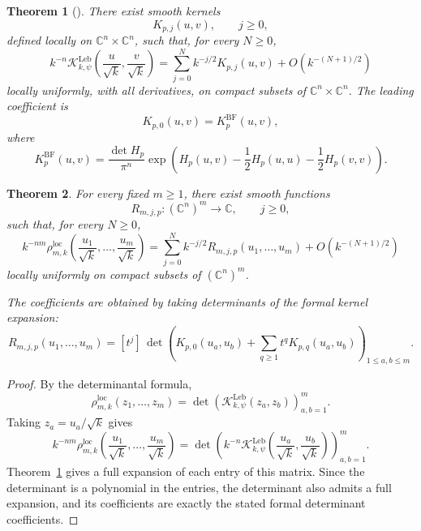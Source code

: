 \documentclass[12pt,a4paper,reqno]{article}
\theoremstyle{thmstyleone}
\newtheorem{theorem}{Theorem}[subsection]
\theoremstyle{thmstylethree}
\theoremstyle{thmstyletwo}
\numberwithin{equation}{subsection}
\def\geq{\geqslant}
\def\leq{\leqslant}
\begin{document}
\begin{theorem}[{\cite[Thms.~4.1.24 and~4.2.1]{MaMa}}]\label{thm:MM-near-diagonal}
There exist smooth kernels
\[
    K_{p,j}(u,v),\qquad j\geq 0,
\]
defined locally on $\mathbb C^n\times\mathbb C^n$, such that, for every $N\geq 0$,
\[
    k^{-n}
    \mathcal K_{k,\psi}^{\mathrm{Leb}}
    \left(\frac{u}{\sqrt k},\frac{v}{\sqrt k}\right)
    =
    \sum_{j=0}^N k^{-j/2}K_{p,j}(u,v)
    +O(k^{-(N+1)/2})
\]
locally uniformly, with all derivatives, on compact subsets of
$\mathbb C^n\times\mathbb C^n$. The leading coefficient is
\[
    K_{p,0}(u,v)=K_p^{\mathrm{BF}}(u,v),
\]
where
\[
    K_p^{\mathrm{BF}}(u,v)
    =
    \frac{\det H_p}{\pi^n}
    \exp\left(
        H_p(u,v)
        -\frac12H_p(u,u)
        -\frac12H_p(v,v)
    \right).
\]
\end{theorem}

\begin{theorem}\label{thm:BF-local-universality}
For every fixed $m\geq 1$, there exist smooth functions
\[
    R_{m,j,p}:(\mathbb C^n)^m\longrightarrow \mathbb C,
    \qquad j\geq 0,
\]
such that, for every $N\geq 0$,
\[
    k^{-nm}\rho^{\mathrm{loc}}_{m,k}
    \left(\frac{u_1}{\sqrt k},\ldots,\frac{u_m}{\sqrt k}\right)
    =
    \sum_{j=0}^N k^{-j/2}
    R_{m,j,p}(u_1,\ldots,u_m)
    +
    O(k^{-(N+1)/2})
\]
locally uniformly on compact subsets of $(\mathbb C^n)^m$.

The coefficients are obtained by taking determinants of the formal kernel expansion:
\[
    R_{m,j,p}(u_1,\ldots,u_m)
    =
    [t^j]\,
    \det\left(
        K_{p,0}(u_a,u_b)
        +
        \sum_{q\geq 1}t^q K_{p,q}(u_a,u_b)
    \right)_{1\leq a,b\leq m}.
\]
\end{theorem}

\begin{proof}
By the determinantal formula,
\[
    \rho^{\mathrm{loc}}_{m,k}(z_1,\ldots,z_m)
    =
    \det\left(
        \mathcal K_{k,\psi}^{\mathrm{Leb}}(z_a,z_b)
    \right)_{a,b=1}^m .
\]
Taking $z_a=u_a/\sqrt k$ gives
\[
    k^{-nm}\rho^{\mathrm{loc}}_{m,k}
    \left(\frac{u_1}{\sqrt k},\ldots,\frac{u_m}{\sqrt k}\right)
    =
    \det\left(
        k^{-n}\mathcal K_{k,\psi}^{\mathrm{Leb}}
        \left(\frac{u_a}{\sqrt k},\frac{u_b}{\sqrt k}\right)
    \right)_{a,b=1}^m .
\]
Theorem~\ref{thm:MM-near-diagonal} gives a full expansion of each entry of this matrix. Since the determinant is a polynomial in the entries, the determinant also admits a full expansion, and its coefficients are exactly the stated formal determinant coefficients.
\end{proof}
\end{document}
